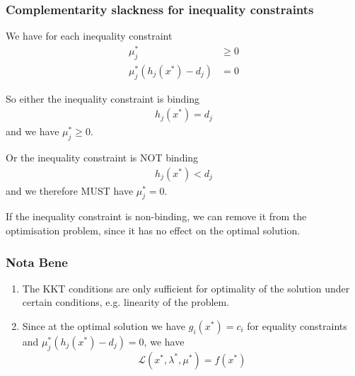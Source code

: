 \documentclass[10pt,aspectratio=169,dvipsnames]{beamer}
\def\l{\lambda}
\def\m{\mu}
\def\cL{\mathcal{L}}
\let\olditem\item
\renewcommand{\item}{%
\olditem\vspace{5pt}}
\begin{document}
\begin{frame}
  \frametitle{Complementarity slackness for inequality constraints}


  We have for each inequality constraint
  \begin{align*}
    \m_j^* & \geq  0 \\
    \m_j^*(h_j(x^*) - d_j) & = 0
  \end{align*}

  So \alert{either} the inequality constraint is binding
  \begin{align*}
    h_j(x^*)  = d_j
  \end{align*}
  and we have $\m_j^* \geq 0$.

  \alert{Or} the inequality constraint is NOT binding
  \begin{align*}
    h_j(x^*)  < d_j
  \end{align*}
  and we therefore MUST have $\m_j^* = 0$.

  If the inequality constraint is non-binding, we can remove it from the optimisation problem, since it has no effect on the optimal solution.
\end{frame}




\begin{frame}
  \frametitle{Nota Bene}

  \begin{enumerate}
  \item The KKT conditions are only \alert{sufficient} for optimality
    of the solution under certain conditions, e.g. linearity of the
    problem.
  \item Since at the optimal solution we have $g_i(x^*) = c_i$ for equality constraints and
    $\m_j^*(h_j(x^*) - d_j) = 0$, we have
    \begin{equation*}
         \cL(x^*,\l^*,\m^*) = f(x^*)
    \end{equation*}


  \end{enumerate}

\end{frame}
\end{document}
